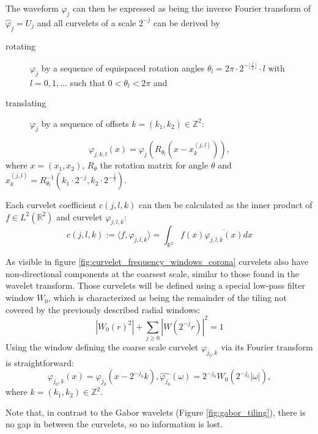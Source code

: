 The waveform $\varphi_j$ can then be expressed as being the inverse Fourier
transform of $\hat{\varphi}_j = U_j$ and all curvelets of a scale $2^{-j}$ can
be derived by
\begin{description}
    \item[rotating] $\varphi_j$ by a sequence of equispaced rotation angles
        $\theta_l = 2 \pi \cdot 2^{-\lfloor\frac{j}{2}\rfloor} \cdot l$ with $l
        = 0,1,\dots$ such that $0 < \theta_l < 2 \pi$ and
    \item[translating] $\varphi_j$ by a sequence of offsets $k = (k_1, k_2) \in \mathbb{Z}^2$:
\end{description}
\begin{equation} \label{eq:continuous_curvelet}
    \varphi_{j,k,l}(x) = \varphi_j(R_{\theta_l}(x - x_k^{(j,l)})),
\end{equation}
where $x = (x_1, x_2)$, $R_{\theta}$ the rotation matrix for angle $\theta$ and
$x_k^{(j,l)} = R_{\theta_l}^{-1}(k_1 \cdot 2^{-j}, k_2 \cdot
2^{-\frac{j}{2}})$.

Each curvelet coefficient $c(j, l, k)$ can then be calculated as the inner
product of $f \in L^2(\mathbb{R}^2)$ and curvelet $\varphi_{j, l, k}$:
\begin{equation} \label{eq:continuous_curvelet_coefficient}
    c(j, l, k) := \langle f, \varphi_{j, l, k} \rangle = \int_{\mathbb{R}^2} f(x) \overline{\varphi_{j, l, k}(x)} dx
\end{equation}

As visible in figure \ref{fig:curvelet_frequency_windows_corona} curvelets also
have non-directional components at the coarsest scale, similar to those found
in the wavelet transform. Those curvelets will be defined using a special
low-pass filter window $W_0$, which is characterized as being the remainder of
the tiling not covered by the previously described radial windows:
\begin{equation*}
    |W_0(r)^2| + \sum_{j \geq 0} |W(2^{-j}r)|^2 = 1
\end{equation*}
Using the window defining the coarse scale curvelet $\varphi_{j_0, k}$ via its
Fourier transform is straightforward:
\begin{equation} \label{eq:continuous_coarse_curvelet}
    \varphi_{j_0, k}(x) = \varphi_{j_0}(x-2^{-j_0}k), \hat{\varphi_{j_0}}(\omega) = 2^{-j_0}W_0(2^{-j_0}|\omega|),
\end{equation}
where $k = (k_1, k_2) \in \mathbb{Z}^2$.

Note that, in contrast to the Gabor wavelets (Figure \ref{fig:gabor_tiling}),
there is no gap in between the curvelets, so no information is lost.

